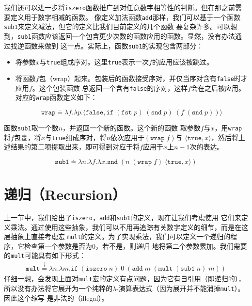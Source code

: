 \documentclass[12pt]{article}
\begin{document}
\indent{}我们还可以进一步将\texttt{iszero}函数推广到对任意数字相等性的判断。但在那之前需要定义用于数字相减的函数。
像定义加法函数\texttt{add}那样，我们可以基于一个函数\texttt{sub1}来定义减法，但它的定义比我们目前定义的几个函数
要复杂许多。可以想到，\texttt{sub1}函数应该返回一个包含更少次数的函数应用的函数。显然，没有办法通过找逆函数来做到
这一点。实际上，函数\texttt{sub1}的实现包含两部分：
\begin{itemize}
\item 将参数$x$与\texttt{true}组成序对。这里\texttt{true}表示一次$f$的应用应该被跳过。
\item 将函数$f$包（wrap）起来。包装后的函数接受序对，并仅当序对含有\texttt{false}时才应用$f$。这个包装函数
      总返回一个含有\texttt{false}的序对，这样$f$会在之后被应用。对应的\texttt{wrap}函数定义如下：
\begin{tcolorbox}[top=-0.6em,left=0mm,right=0mm,bottom=0mm]
\begin{displaymath}
\texttt{wrap} \doteq
\lambda{}f.\lambda{}p.\langle\texttt{false},
\texttt{if}\;(\texttt{fst}\;p)\;(\texttt{snd}\;p)\;
(f\;(\texttt{snd}\;p))\rangle
\end{displaymath}
\end{tcolorbox}
\end{itemize}
\noindent{}函数\texttt{sub1}取一个数$n$，并返回一个新的函数。这个新的函数
取参数$f$与$x$，用\texttt{wrap}将$f$包裹，将$x$与\texttt{true}组成序对，将$n$依次应用于$(\texttt{wrap}\;f)$与
$\langle\texttt{true},x\rangle$，然后将上述结果的第二项提取出来，即可得到对应于将$f$应用于$x$上$n-1$次的表达。
\begin{tcolorbox}[top=-0.4em,left=0mm,right=0mm,bottom=1mm]
\begin{displaymath}
\texttt{sub1} \doteq
\lambda{}n.\lambda{}f.\lambda{}x.\texttt{snd}\;(n\;(\texttt{wrap}\;f)\;\langle\texttt{true},x\rangle)
\end{displaymath}
\end{tcolorbox}
\clearpage

\section{递归（Recursion）}
\indent{}上一节中，我们给出了\texttt{iszero}，\texttt{add}和\texttt{sub1}的定义，现在让我们考虑使用
它们来定义乘法。通过使用这些抽象，我们可以不用再追踪有关数字定义的细节，而是在这层抽象上直接考虑宏
\texttt{mult}的定义。为了实现乘法，我们可以定义一个递归的程序，它检查第一个参数是否为0，若不是，则递归
地将第二个参数累加。我们需要的\texttt{mult}可能具有如下形式：
\vspace{-0.5em}
\begin{gather*}
\texttt{mult} \overset{?}{\doteq}
\lambda{}n.\lambda{}m.\texttt{if}\;(\texttt{iszero}\;n)\;0
\;(\texttt{add}\;m\;(\texttt{mult}\;(\texttt{sub1}\;n)\;m))
\end{gather*}
\noindent{}仔细一想，会发现上面对\texttt{mult}宏的定义有点问题，因为它有自引用（即递归的），
所以没有办法将它展开为一个纯粹的$\lambda$-演算表达式（因为展开并不能消掉\texttt{mult}）。因此这个缩写
是非法的（illegal）。
\end{document}
